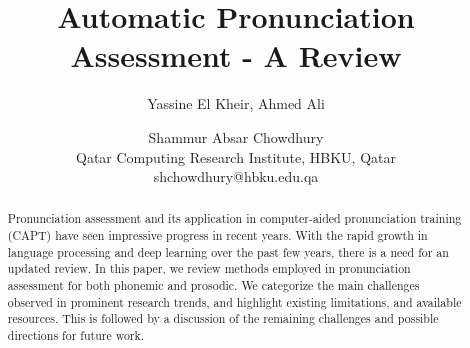 \documentclass[11pt]{article}
\title{Automatic Pronunciation Assessment - A Review}
\author{Yassine El Kheir, Ahmed Ali \and Shammur Absar Chowdhury \\
        Qatar Computing Research Institute, HBKU, Qatar\\
        shchowdhury@hbku.edu.qa}
\begin{document}
\maketitle
\begin{abstract}


Pronunciation assessment and its application in computer-aided pronunciation training (CAPT) have seen impressive progress in recent years. With the rapid growth in language processing and deep learning over the past few years, there is a need for an updated review. In this paper, we review methods employed in pronunciation assessment for both phonemic and prosodic. We categorize the main challenges observed in prominent research trends, and highlight existing limitations, and available resources. This is followed by a discussion of the remaining challenges and possible directions for future work.

\end{abstract}


\end{document}
